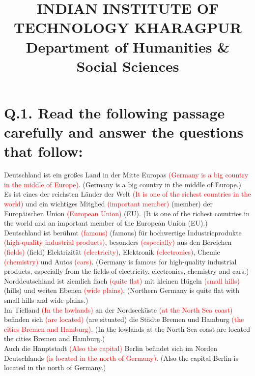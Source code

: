 \documentclass{article}
\title{
INDIAN INSTITUTE OF TECHNOLOGY KHARAGPUR \\
Department of Humanities \& Social Sciences
}
\date{}
\begin{document}
\maketitle

\section*{Q.1. Read the following passage carefully and answer the questions that follow:}

Deutschland ist ein großes Land in der Mitte Europas \textcolor{red}{(Germany is a big country in the middle of Europe)}. (Germany is a big country in the middle of Europe.)\\
Es ist eines der reichsten Länder der Welt \textcolor{red}{(It is one of the richest countries in the world)} und ein wichtiges Mitglied \textcolor{red}{(important member)} (member) der Europäischen Union \textcolor{red}{(European Union)} (EU). (It is one of the richest countries in the world and an important member of the European Union (EU).) \\
Deutschland ist berühmt \textcolor{red}{(famous)} (famous) für hochwertige Industrieprodukte \textcolor{red}{(high-quality industrial products)}, besonders \textcolor{red}{(especially)} aus den Bereichen \textcolor{red}{(fields)} (field) Elektrizität \textcolor{red}{(electricity)}, Elektronik \textcolor{red}{(electronics)}, Chemie \textcolor{red}{(chemistry)} und Autos \textcolor{red}{(cars)}. (Germany is famous for high-quality industrial products, especially from the fields of electricity, electronics, chemistry and cars.) \\
Norddeutschland ist ziemlich flach \textcolor{red}{(quite flat)} mit kleinen Hügeln \textcolor{red}{(small hills)} (hills) und weiten Ebenen \textcolor{red}{(wide plains)}. (Northern Germany is quite flat with small hills and wide plains.) \\
Im Tiefland \textcolor{red}{(In the lowlands)} an der Nordseeküste \textcolor{red}{(at the North Sea coast)} befinden sich \textcolor{red}{(are located)} (are situated) die Städte Bremen und Hamburg \textcolor{red}{(the cities Bremen and Hamburg)}. (In the lowlands at the North Sea coast are located the cities Bremen and Hamburg.)\\
Auch die Hauptstadt \textcolor{red}{(Also the capital)} Berlin befindet sich im Norden Deutschlands \textcolor{red}{(is located in the north of Germany)}. (Also the capital Berlin is located in the north of Germany.)
\end{document}
